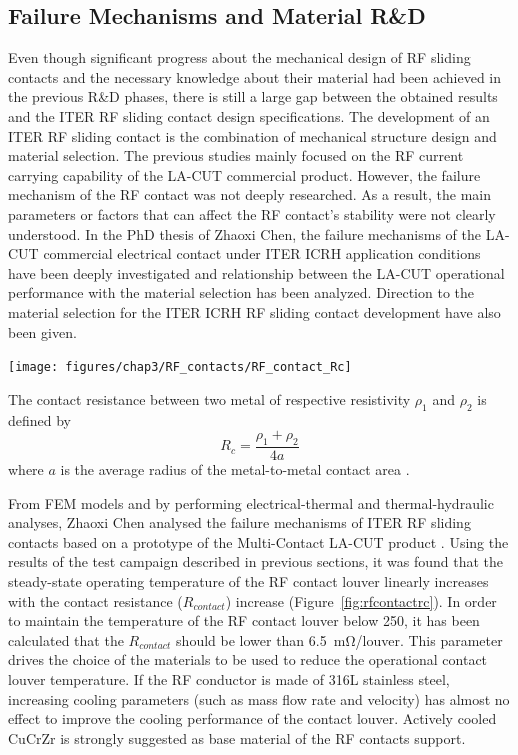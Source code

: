 {\subsection{Failure Mechanisms and Material R\&D}
Even though significant progress about the mechanical design of RF sliding contacts and the necessary knowledge about their material had been achieved in the previous R\&D phases, there is still a large gap between the obtained results and the ITER RF sliding contact design specifications. The development of an ITER RF sliding contact is the combination of mechanical structure design and material selection. The previous studies mainly focused on the RF current carrying capability of the LA-CUT commercial product. However, the failure mechanism of the RF contact was not deeply researched. As a result, the main parameters or factors that can affect the RF contact's stability were not clearly understood. In the PhD thesis of Zhaoxi Chen, the failure mechanisms of the LA-CUT commercial electrical contact under ITER ICRH application conditions have been deeply investigated and relationship between the LA-CUT operational performance with the material selection has been analyzed. Direction to the material selection for the ITER ICRH RF sliding contact development have also been given. 

\begin{marginfigure}
	\centering
	\texttt{[image: figures/chap3/RF\_contacts/RF\_contact\_Rc]}
	\caption{The contact resistance between two metal of respective resistivity $\rho_1$ and $\rho_2$ is defined by $$R_c=\frac{\rho_1+\rho_2}{4a}$$ where $a$ is the average radius of the metal-to-metal contact area .}
	\label{fig:rfcontactrc}
\end{marginfigure}

From FEM models and by performing electrical-thermal and thermal-hydraulic analyses, Zhaoxi Chen analysed the failure mechanisms of ITER RF sliding contacts based on a prototype of the Multi-Contact LA-CUT product . Using the results of the test campaign described in previous sections, it was found that the steady-state operating temperature of the RF contact louver linearly increases with the contact resistance ($R_{contact}$) increase (Figure~\ref{fig:rfcontactrc}). In order to maintain the temperature of the RF contact louver below 250\degC, it has been calculated that the $R_{contact}$ should be lower than 6.5~$\si{\milli\ohm}$/louver. This parameter drives the choice of the materials to be used to reduce the operational contact louver temperature. If the RF conductor is made of 316L stainless steel, increasing cooling parameters (such as mass flow rate and velocity) has almost no effect to improve the cooling performance of the contact louver. Actively cooled CuCrZr is strongly suggested as base material of the RF contacts support. 

}
